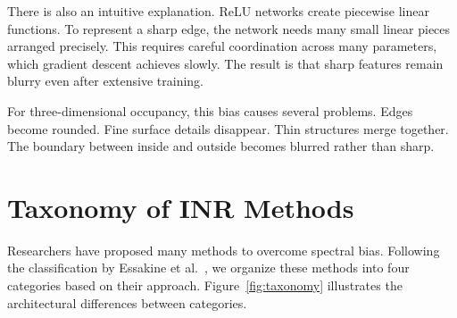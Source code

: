 There is also an intuitive explanation. ReLU networks create piecewise linear functions. To represent a sharp edge, the network needs many small linear pieces arranged precisely. This requires careful coordination across many parameters, which gradient descent achieves slowly. The result is that sharp features remain blurry even after extensive training.

For three-dimensional occupancy, this bias causes several problems. Edges become rounded. Fine surface details disappear. Thin structures merge together. The boundary between inside and outside becomes blurred rather than sharp.

\section{Taxonomy of INR Methods}

Researchers have proposed many methods to overcome spectral bias. Following the classification by Essakine et al.~\cite{essakine2024inr}, we organize these methods into four categories based on their approach. Figure~\ref{fig:taxonomy} illustrates the architectural differences between categories.

